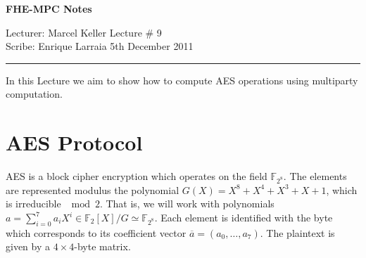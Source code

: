 \documentclass[11pt]{article}
\begin{document}
\thispagestyle{empty}


\begin{center}
\bf\large FHE-MPC Notes
\end{center}

\noindent
Lecturer: Marcel Keller     %
\hfill
Lecture \# 9              %
\\
Scribe: Enrique Larraia   %
\hfill 5th December 2011

\noindent
\rule{\textwidth}{1pt}

\medskip

In this Lecture we aim to show how to compute AES operations using multiparty computation.
\section*{AES Protocol}
AES is a block cipher encryption which operates on the field $\mathbb{F}_{2^8}$. The elements are represented modulus the polynomial $G(X) = X^8 +X^4 + X^3 + X +1$, which is irreducible $\mod{2}$. That is, we will work with polynomials $a = \sum_{i=0}^7 a_iX^i \in \mathbb{F}_2[X]/G \simeq \mathbb{F}_{2^8}$. Each element is identified with the byte which corresponds to its coefficient vector $\overline{a} = (a_0, \ldots ,a_7)$. The plaintext is given by a $4\times4$-byte matrix.
\end{document}
